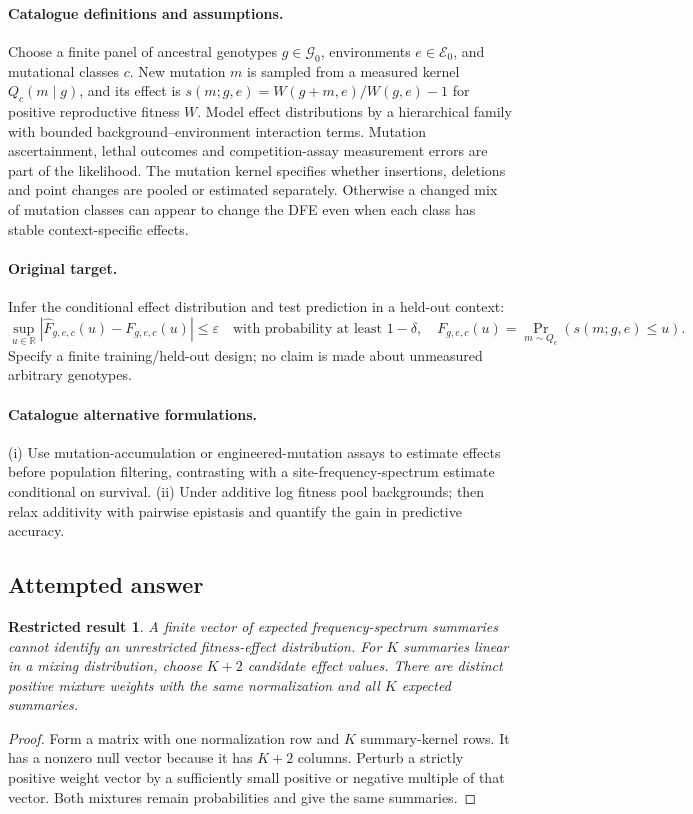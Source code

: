 \documentclass[11pt]{article}
\newcommand{\R}{\mathbb R}
\providecommand{\R}{\mathbb R}
\newtheorem{attemptresult}{Restricted result}[section]
\begin{document}
\paragraph{Catalogue definitions and assumptions.}
Choose a finite panel of ancestral genotypes $g\in\mathcal G_0$, environments $e\in\mathcal E_0$, and mutational classes $c$. New mutation $m$ is sampled from a measured kernel $Q_c(m\mid g)$, and its effect is $s(m;g,e)=W(g+m,e)/W(g,e)-1$ for positive reproductive fitness $W$. Model effect distributions by a hierarchical family with bounded background--environment interaction terms. Mutation ascertainment, lethal outcomes and competition-assay measurement errors are part of the likelihood. The mutation kernel specifies whether insertions, deletions and point changes are pooled or estimated separately. Otherwise a changed mix of mutation classes can appear to change the DFE even when each class has stable context-specific effects.
\paragraph{Original target.}
Infer the conditional effect distribution and test prediction in a held-out context:
\[
 \sup_{u\in\R}
 |\widehat F_{g,e,c}(u)-F_{g,e,c}(u)|\le\varepsilon
 \quad\text{with probability at least }1-\delta,
 \quad F_{g,e,c}(u)=\Pr_{m\sim Q_c}(s(m;g,e)\le u).
\]
Specify a finite training/held-out design; no claim is made about unmeasured arbitrary genotypes.
\paragraph{Catalogue alternative formulations.}
(i) Use mutation-accumulation or engineered-mutation assays to estimate effects before population filtering, contrasting with a site-frequency-spectrum estimate conditional on survival. (ii) Under additive log fitness pool backgrounds; then relax additivity with pairwise epistasis and quantify the gain in predictive accuracy.
\subsection{Attempted answer}
\begin{attemptresult}
A finite vector of expected frequency-spectrum summaries cannot identify an unrestricted fitness-effect distribution. For $K$ summaries linear in a mixing distribution, choose $K+2$ candidate effect values. There are distinct positive mixture weights with the same normalization and all $K$ expected summaries.
\end{attemptresult}
\begin{proof}
Form a matrix with one normalization row and $K$ summary-kernel rows. It has a nonzero null vector because it has $K+2$ columns. Perturb a strictly positive weight vector by a sufficiently small positive or negative multiple of that vector. Both mixtures remain probabilities and give the same summaries.
\end{proof}
\end{document}
